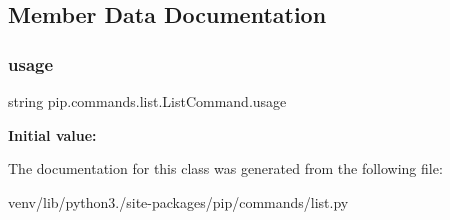 \subsection{Member Data Documentation}
\mbox{\label{classpip_1_1commands_1_1list_1_1_list_command_a83335d7157e4a27cef8aace937818b71}} 
\subsubsection{\texorpdfstring{usage}{usage}}
{\footnotesize\ttfamily string pip.\+commands.\+list.\+List\+Command.\+usage\hspace{0.3cm}{\ttfamily [static]}}

{\bfseries Initial value\+:}
\begin{DoxyCode}
=  \textcolor{stringliteral}{"""}
\textcolor{stringliteral}{  %
\end{DoxyCode}


The documentation for this class was generated from the following file\+:\begin{DoxyCompactItemize}
\item 
venv/lib/python3./site-\/packages/pip/commands/list.\+py\end{DoxyCompactItemize}
